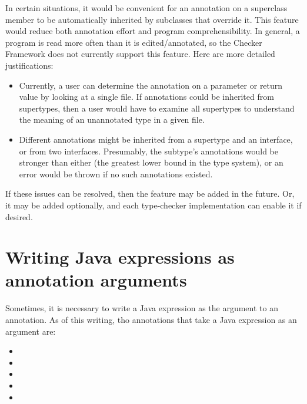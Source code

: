 In certain situations, it would be convenient for an annotation on a
superclass member to be automatically inherited by subclasses that override
it.  This feature would reduce both annotation effort and program
comprehensibility.  In general, a program is read more often than it is
edited/annotated, so the Checker Framework does not currently support this
feature.  Here are more detailed justifications:

\begin{itemize}

\item
  Currently, a user can determine the annotation on a parameter or return
  value by looking at a single file.  If annotations could be inherited
  from supertypes, then a user would have to examine all supertypes to
  understand the meaning of an unannotated type in a given file.

\item
  Different annotations might be inherited from a supertype and an
  interface, or from two interfaces.  Presumably, the subtype's annotations
  would be stronger than either (the greatest lower bound in the type
  system), or an error would be thrown if no such annotations existed.

\end{itemize}

If these issues can be resolved, then the feature may be added in the
future.  Or, it may be added optionally, and each type-checker
implementation can enable it if desired.


\section{Writing Java expressions as annotation arguments\label{java-expressions-as-arguments}}

Sometimes, it is necessary to write a Java expression as the argument to an
annotation.  As of this writing, tho annotations that take a Java
expression as an argument are:

\begin{itemize}
\item {}
\item {}
\item {}
\item {}
\item {}
\end{itemize}

